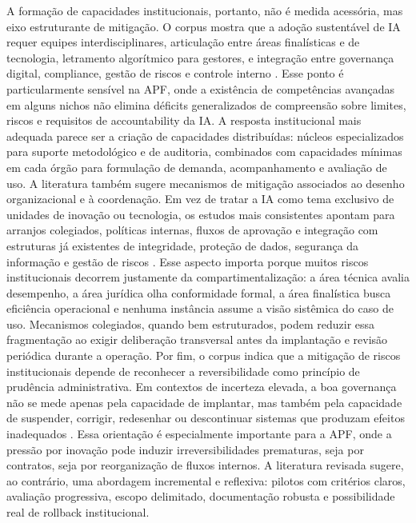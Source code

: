 \documentclass[12pt,a4paper]{article}
\begin{document}
A formação de capacidades institucionais, portanto, não é medida acessória, mas eixo estruturante de mitigação. O corpus mostra que a adoção sustentável de IA requer equipes interdisciplinares, articulação entre áreas finalísticas e de tecnologia, letramento algorítmico para gestores, e integração entre governança digital, compliance, gestão de riscos e controle interno \autocite{goulart2025processos} \autocite{madan2022ai}. Esse ponto é particularmente sensível na APF, onde a existência de competências avançadas em alguns nichos não elimina déficits generalizados de compreensão sobre limites, riscos e requisitos de accountability da IA. A resposta institucional mais adequada parece ser a criação de capacidades distribuídas: núcleos especializados para suporte metodológico e de auditoria, combinados com capacidades mínimas em cada órgão para formulação de demanda, acompanhamento e avaliação de uso.
A literatura também sugere mecanismos de mitigação associados ao desenho organizacional e à coordenação. Em vez de tratar a IA como tema exclusivo de unidades de inovação ou tecnologia, os estudos mais consistentes apontam para arranjos colegiados, políticas internas, fluxos de aprovação e integração com estruturas já existentes de integridade, proteção de dados, segurança da informação e gestão de riscos \autocite{serra2024a} \autocite{goulart2025processos} \autocite{batool2025ai}. Esse aspecto importa porque muitos riscos institucionais decorrem justamente da compartimentalização: a área técnica avalia desempenho, a área jurídica olha conformidade formal, a área finalística busca eficiência operacional e nenhuma instância assume a visão sistêmica do caso de uso. Mecanismos colegiados, quando bem estruturados, podem reduzir essa fragmentação ao exigir deliberação transversal antes da implantação e revisão periódica durante a operação.
Por fim, o corpus indica que a mitigação de riscos institucionais depende de reconhecer a reversibilidade como princípio de prudência administrativa. Em contextos de incerteza elevada, a boa governança não se mede apenas pela capacidade de implantar, mas também pela capacidade de suspender, corrigir, redesenhar ou descontinuar sistemas que produzam efeitos inadequados \autocite{batool2025ai} \autocite{pi2021machine}. Essa orientação é especialmente importante para a APF, onde a pressão por inovação pode induzir irreversibilidades prematuras, seja por contratos, seja por reorganização de fluxos internos. A literatura revisada sugere, ao contrário, uma abordagem incremental e reflexiva: pilotos com critérios claros, avaliação progressiva, escopo delimitado, documentação robusta e possibilidade real de rollback institucional.
\end{document}
